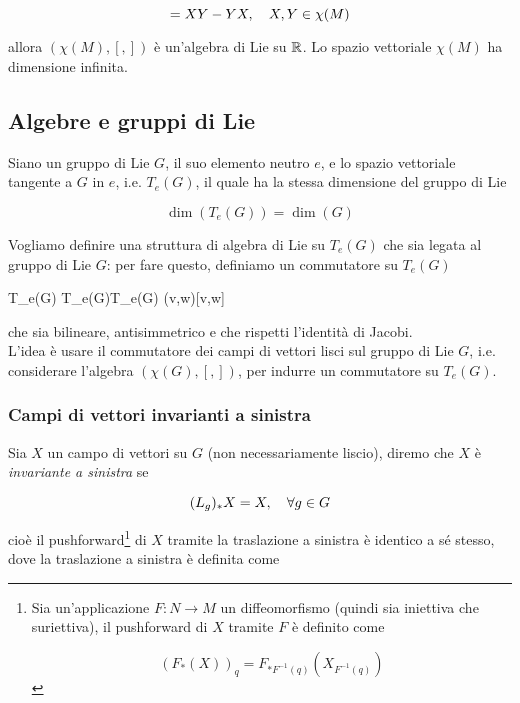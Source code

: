 \begin{equation}
	[X,Y] = XY - YX \qcomma X,Y \in \chi(M)
\end{equation}

allora $ (\chi(M),[,]) $ è un'algebra di Lie su $ \mathbb{R} $. Lo spazio vettoriale $ \chi(M) $ ha dimensione infinita.

\subsection{Algebre e gruppi di Lie}

Siano un gruppo di Lie $ G $, il suo elemento neutro $ e $, e lo spazio vettoriale tangente a $ G $ in $ e $, i.e. $ T_{e}(G) $, il quale ha la stessa dimensione del gruppo di Lie

\begin{equation}
	\dim(T_{e}(G)) = \dim(G)
\end{equation}

Vogliamo definire una struttura di algebra di Lie su $ T_{e}(G) $ che sia legata al gruppo di Lie $ G $: per fare questo, definiamo un commutatore su $ T_{e}(G) $

\map{[,]}
	{T_{e}(G) \times T_{e}(G)}{T_{e}(G)}
	{(v,w)}{[v,w]}

che sia bilineare, antisimmetrico e che rispetti l'identità di Jacobi.\\
L'idea è usare il commutatore dei campi di vettori lisci sul gruppo di Lie $ G $, i.e. considerare l'algebra $ (\chi(G),[,]) $, per indurre un commutatore su $ T_{e}(G) $.

\subsubsection{Campi di vettori invarianti a sinistra}

Sia $ X $ un campo di vettori su $ G $ (non necessariamente liscio), diremo che $ X $ è \textit{invariante a sinistra} se

\begin{equation}
	(L_{g})_{*} X = X \qcomma \forall g \in G
\end{equation}

cioè il pushforward\footnote{%
	Sia un'applicazione $ F : N \to M $ un diffeomorfismo (quindi sia iniettiva che suriettiva), il pushforward di $ X $ tramite $ F $ è definito come

	\begin{equation*}
		(F_{*} (X))_{q} = F_{*F^{-1}(q)} (X_{F^{-1}(q)})
	\end{equation*}%
} di $ X $ tramite la traslazione a sinistra è identico a sé stesso, dove la traslazione a sinistra è definita come

